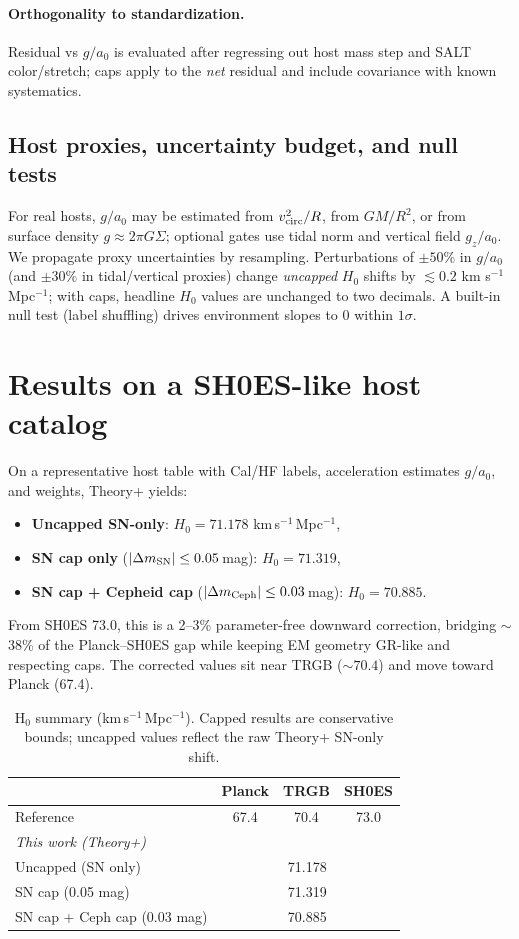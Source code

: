 \documentclass[aps,prd,preprint,onecolumn,longbibliography,nofootinbib]{revtex4-2}
\theoremstyle{plain}
\theoremstyle{remark}
\newcommand{\Hzero}{H_0}
\begin{document}
\paragraph*{Orthogonality to standardization.}
Residual vs $g/a_0$ is evaluated after regressing out host mass step and SALT color/stretch; caps apply to the \emph{net} residual and include covariance with known systematics.

\subsection{Host proxies, uncertainty budget, and null tests}\label{sec:host_proxies}
For real hosts, $g/a_0$ may be estimated from $v_{\rm circ}^2/R$, from $GM/R^2$, or from surface density $g\!\approx\! 2\pi G\Sigma$; optional gates use tidal norm and vertical field $g_z/a_0$. We propagate proxy uncertainties by resampling. Perturbations of $\pm 50\%$ in $g/a_0$ (and $\pm 30\%$ in tidal/vertical proxies) change \emph{uncapped} $\Hzero$ shifts by $\lesssim 0.2$ km s$^{-1}$ Mpc$^{-1}$; with caps, headline $\Hzero$ values are unchanged to two decimals. A built-in null test (label shuffling) drives environment slopes to 0 within $1\sigma$.

\section{Results on a SH0ES-like host catalog}
On a representative host table with Cal/HF labels, acceleration estimates $g/a_0$, and weights, Theory+ yields:
\begin{itemize}
\item \textbf{Uncapped SN-only}: $\Hzero = 71.178$ km\,s$^{-1}$\,Mpc$^{-1}$,
\item \textbf{SN cap only} ($|\Delta m_{\rm SN}|\le 0.05$\,mag): $\Hzero = 71.319$,
\item \textbf{SN cap + Cepheid cap} ($|\Delta m_{\rm Ceph}|\le 0.03$\,mag): $\Hzero = 70.885$.
\end{itemize}
From SH0ES 73.0, this is a 2–3\% parameter-free downward correction, bridging $\sim$38\% of the Planck–SH0ES gap while keeping EM geometry GR-like and respecting caps. The corrected values sit near TRGB ($\sim 70.4$) and move toward Planck (67.4).

\begin{table}[t]
\centering
\caption{H$_0$ summary (km\,s$^{-1}$\,Mpc$^{-1}$). Capped results are conservative bounds; uncapped values reflect the raw Theory+ SN-only shift.}
\begin{tabular}{lccc}
\toprule
 & Planck & TRGB & SH0ES \\
\midrule
Reference & 67.4 & 70.4 & 73.0 \\
\midrule
\multicolumn{4}{l}{\emph{This work (Theory+)}}\\
Uncapped (SN only) & \multicolumn{3}{c}{71.178} \\
SN cap (0.05 mag)  & \multicolumn{3}{c}{71.319} \\
SN cap + Ceph cap (0.03 mag) & \multicolumn{3}{c}{70.885} \\
\bottomrule
\end{tabular}
\end{table}
\end{document}
